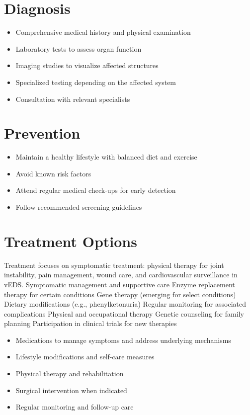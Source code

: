 \section{Diagnosis}
\begin{itemize}[noitemsep]
  \item Comprehensive medical history and physical examination
  \item Laboratory tests to assess organ function
  \item Imaging studies to visualize affected structures
  \item Specialized testing depending on the affected system
  \item Consultation with relevant specialists
\end{itemize}
\section{Prevention}
\begin{itemize}[noitemsep]
  \item Maintain a healthy lifestyle with balanced diet and exercise
  \item Avoid known risk factors
  \item Attend regular medical check-ups for early detection
  \item Follow recommended screening guidelines
\end{itemize}
\section{Treatment Options}
Treatment focuses on symptomatic treatment: physical therapy for joint instability, pain management, wound care, and cardiovascular surveillance in vEDS. Symptomatic management and supportive care Enzyme replacement therapy for certain conditions Gene therapy (emerging for select conditions) Dietary modifications (e.g., phenylketonuria) Regular monitoring for associated complications Physical and occupational therapy Genetic counseling for family planning Participation in clinical trials for new therapies

\begin{itemize}[noitemsep]
  \item Medications to manage symptoms and address underlying mechanisms
  \item Lifestyle modifications and self-care measures
  \item Physical therapy and rehabilitation
  \item Surgical intervention when indicated
  \item Regular monitoring and follow-up care
\end{itemize}
